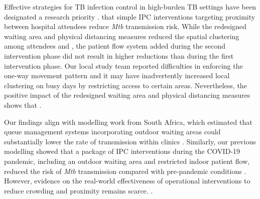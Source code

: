 \documentclass[11pt]{article}
\begin{document}
Effective strategies for TB infection control in high-burden TB settings have been designated a research priority \cite{yates2016LancetInfectDis}.\label{disc:interventions}  that simple IPC interventions targeting proximity between hospital attendees  reduce \emph{Mtb} transmission risk. While the redesigned waiting area and physical distancing measures reduced the spatial clustering among attendees and \label{chg:R2.1disc2}, the patient flow system added during the second intervention phase did not result in higher  reductions than during the first intervention phase. Our local study team reported difficulties in enforcing the one-way movement pattern and it may have inadvertently increased local clustering on busy days by restricting access to certain areas. Nevertheless, the positive impact of the redesigned waiting area and physical distancing measures shows that  \cite{bozzani2023BMJGlobHealth}.\label{chg:R2.30disc}

Our findings align with modelling work from South Africa, which estimated that queue management systems incorporating outdoor waiting areas could substantially lower the rate of transmission within clinics \cite{mccreesh2021BMJGlobHealth}. Similarly, our previous modelling showed that a package of IPC interventions during the COVID-19 pandemic, including an outdoor waiting area and restricted indoor patient flow, reduced the risk of \emph{Mtb} transmission compared with pre-pandemic conditions \cite{banholzer2025IntJInfectDis}. However, evidence on the real-world effectiveness of operational interventions to reduce crowding and proximity remains scarce. .\label{chg:R2.1disc3}
\end{document}
